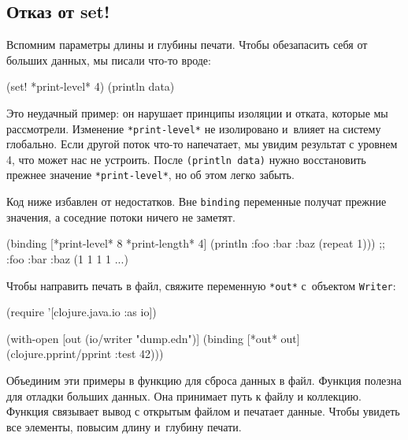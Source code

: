 \subsection{Отказ от set!}

Вспомним параметры длины и глубины печати. Чтобы обезапасить себя от больших
данных, мы писали что-то вроде:

\begin{english}
  \begin{clojure}
(set! *print-level* 4)
(println data)
  \end{clojure}
\end{english}


Это неудачный пример: он нарушает принципы изоляции и отката, которые мы
рассмотрели. Изменение \verb|*print-level*| не изолировано и~влияет на систему
глобально. Если другой поток что-то напечатает, мы увидим результат с уровнем 4,
что может нас не устроить. После \verb|(println data)| нужно восстановить
прежнее значение \verb|*print-level*|, но об этом легко забыть.

Код ниже избавлен от недостатков. Вне \verb|binding| переменные получат
прежние значения, а соседние потоки ничего не заметят.

\begin{english}
  \begin{clojure}
(binding [*print-level* 8
          *print-length* 4]
  (println {:foo {:bar {:baz (repeat 1)}}}))
;; {:foo {:bar {:baz (1 1 1 1 ...)}}}
  \end{clojure}
\end{english}


Чтобы направить печать в файл, свяжите переменную \verb|*out*| с~объектом
\verb|Writer|:

\begin{english}
  \begin{clojure}
(require '[clojure.java.io :as io])

(with-open [out (io/writer "dump.edn")]
  (binding [*out* out]
    (clojure.pprint/pprint {:test 42})))
  \end{clojure}
\end{english}

Объединим эти примеры в функцию для сброса данных в файл. Функция полезна для
отладки больших данных. Она принимает путь к файлу и коллекцию. Функция
связывает вывод с открытым файлом и печатает данные. Чтобы увидеть все элементы,
повысим длину и~глубину печати.

